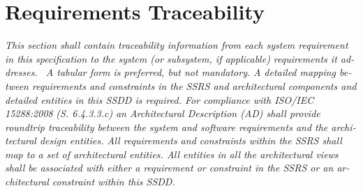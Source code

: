 \documentclass[twoside,letterpaper]{article}
\begin{document}
\bigskip


\bigskip

\section{Requirements Traceability}
{\color{black}
\foreignlanguage{english}{\textit{This section shall contain
traceability information from each system requirement in this
specification to the system (or subsystem, if applicable) requirements
it addresses. \ A tabular form is preferred, but not mandatory.
}}\foreignlanguage{english}{\textit{A detailed mapping between
requirements and constraints in the SSRS and architectural components
and detailed entities in this SSDD is required. For compliance with
ISO/IEC 15288:2008
}}\foreignlanguage{english}{\textit{(S. 6.4.3.3.c)}}\foreignlanguage{english}{\textit{
an Architectural Description (AD) shall provide roundtrip traceability
between the system and software requirements and the architectural
design entities. All requirements and constraints within the SSRS shall
map to a set of architectural entities. All entities in all the
architectural views shall be associated with either a requirement or
constraint in the SSRS or an architectural constraint within this
SSDD.}}}
\end{document}
